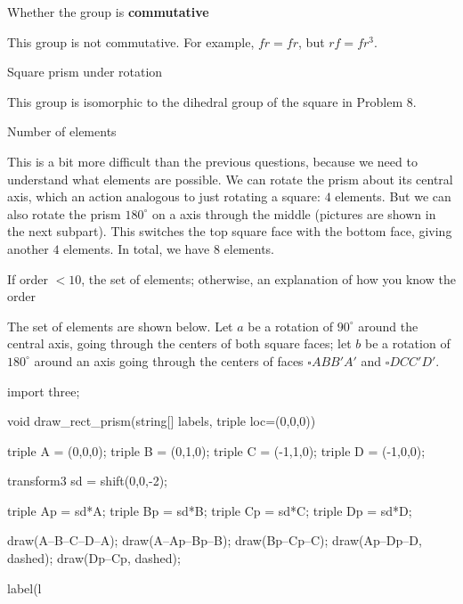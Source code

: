 \documentclass[../gatm_answers.tex]{subfiles}
\begin{document}
\begin{inner_problem}
\item Whether the group is \textbf{commutative}
\end{inner_problem}

This group is not commutative. For example, $fr=fr$, but $rf=fr^3$.

\begin{outer_problem}
\item Square prism under rotation
\end{outer_problem}

This group is isomorphic to the dihedral group of the square in Problem 8.

\begin{inner_problem}[start=1]
\item Number of elements
\end{inner_problem}

This is a bit more difficult than the previous questions, because we need to understand what elements are possible. We can rotate the prism about its central axis, which an action analogous to just rotating a square: $4$ elements. But we can also rotate the prism $180^\circ$ on a axis through the middle (pictures are shown in the next subpart). This switches the top square face with the bottom face, giving another $4$ elements. In total, we have $8$ elements.

\begin{inner_problem}
\item If order $< 10$, the set of elements; otherwise, an explanation of how you know the order
\end{inner_problem}

The set of elements are shown below. Let $a$ be a rotation of $90^\circ$ around the central axis, going through the centers of both square faces; let $b$ be a rotation of $180^\circ$ around an axis going through the centers of faces $\square ABB'A'$ and $\square DCC'D'$.

\begin{asydef}
import three;

void draw_rect_prism(string[] labels, triple loc=(0,0,0)) {
	triple A = (0,0,0);
	triple B = (0,1,0);
	triple C = (-1,1,0);
	triple D = (-1,0,0);
	
	transform3 sd = shift(0,0,-2);
	
	triple Ap = sd*A;
	triple Bp = sd*B;
	triple Cp = sd*C;
	triple Dp = sd*D;
	
	draw(A--B--C--D--A);
	draw(A--Ap--Bp--B);
	draw(Bp--Cp--C);
	draw(Ap--Dp--D, dashed);
	draw(Dp--Cp, dashed);
	
	label(l
}
\end{asydef}
\end{document}
